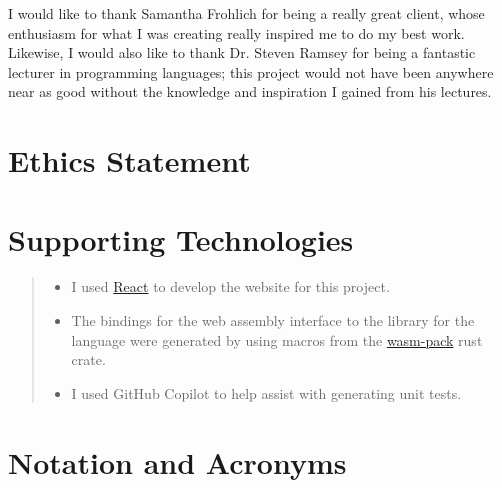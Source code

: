 I would like to thank Samantha Frohlich for being a really great client, whose enthusiasm for what I was creating really inspired me to do my best work. Likewise, I would also like to thank Dr. Steven Ramsey for being a fantastic lecturer in programming languages; this project would not have been anywhere near as good without the knowledge and inspiration I gained from his lectures. 

\makedecl
\makeaidecl
\tableofcontents


\chapter*{Ethics Statement}


\chapter*{Supporting Technologies}
\label{chap:supporting_tech}

\begin{quote}
\noindent
\begin{itemize}
\item I used \href{https://react.dev/}{React} to develop the website for this project.
\item The bindings for the web assembly interface to the library for the language were generated by using macros from the \href{https://github.com/rustwasm/wasm-pack}{wasm-pack} rust crate.
\item I used GitHub Copilot to help assist with generating unit tests.
\end{itemize}
\end{quote}


\chapter*{Notation and Acronyms}
\begin{acronym}
\end{acronym}